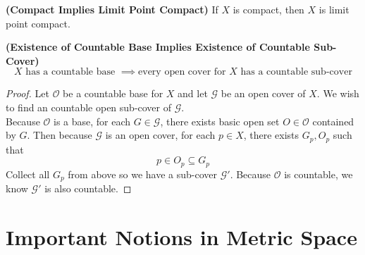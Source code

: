 \documentclass{report}
\begin{document}
\begin{corollary}
\label{0.3.12}
\textbf{(Compact Implies Limit Point Compact)} If $X$ is compact, then $X$ is limit point compact.
\end{corollary}
\begin{theorem}
\label{0.3.13}
\textbf{(Existence of Countable Base Implies Existence of Countable Sub-Cover)} 
\begin{equation}
X\text{ has a countable base }\implies\text{every open cover for $X$ has a countable sub-cover}
\end{equation}
\end{theorem}
\begin{proof}
Let $\mathcal{O}$ be a countable base for $X$ and let $\mathcal{G}$ be an open cover of $X$. We wish to find an countable open sub-cover of $\mathcal{G}$.\\

Because $\mathcal{O}$ is a base, for each $G\in \mathcal{G}$, there exists basic open set $O\in \mathcal{O}$ contained by $G$. Then because  $\mathcal{G}$ is an open cover, for each $p\in X$, there exists $G_p,O_p$ such that
\begin{equation}
p\in O_p\subseteq G_p
\end{equation}
Collect all $G_p$ from above so we have a sub-cover $\mathcal{G}'$. Because $\mathcal{O}$ is countable, we know $\mathcal{G}'$ is also countable.
\end{proof}
\chapter{Important Notions in Metric Space}
\end{document}
